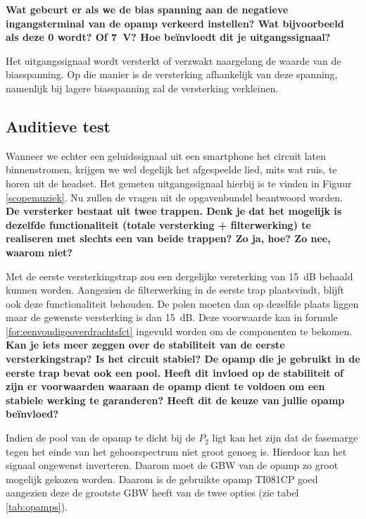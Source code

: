 \documentclass{report}
\begin{document}
\noindent \textbf{Wat gebeurt er als we de bias spanning aan de negatieve ingangsterminal van de opamp verkeerd instellen? Wat bijvoorbeeld als deze 0 wordt? Of \SI{7}{V}? Hoe beïnvloedt dit je
uitgangssignaal?}

\noindent Het uitgangssignaal wordt versterkt of verzwakt naargelang de waarde van de biasspanning. Op die manier is de versterking afhankelijk van deze spanning, namenlijk bij lagere biasspanning zal de versterking verkleinen.

\subsection{Auditieve test}

Wanneer we echter een geluidssignaal uit een smartphone het circuit laten binnenstromen, krijgen we wel degelijk het afgespeelde lied, mits wat ruis, te horen uit de headset. Het gemeten uitgangssignaal hierbij is te vinden in Figuur \ref{scopemuziek}. Nu zullen de vragen uit de opgavenbundel beantwoord worden. \\

\noindent \textbf{De versterker bestaat uit twee trappen. Denk je dat het mogelijk is dezelfde functionaliteit (totale versterking + filterwerking) te realiseren met slechts een van beide trappen? Zo ja, hoe? Zo nee, waarom niet?}

\noindent Met de eerste versterkingstrap zou een dergelijke versterking van \SI{15}{\deci\bel} behaald kunnen worden. Aangezien de filterwerking in de eerste trap plaatsvindt, blijft ook deze functionaliteit behouden. De polen moeten dan op dezelfde plaats liggen maar de gewenste versterking is dan \SI{15}{\deci\bel}. Deze voorwaarde kan in formule \ref{for:eenvoudigeoverdrachtsfct} ingevuld worden om de componenten te bekomen. \\


\noindent \textbf{Kan je iets meer zeggen over de stabiliteit van de eerste versterkingstrap? Is het circuit stabiel? De opamp die je gebruikt in de eerste trap bevat ook een pool. Heeft dit invloed op de stabiliteit of zijn er voorwaarden waaraan de opamp dient te voldoen om een stabiele werking te garanderen? Heeft dit de keuze van jullie opamp beïnvloed?}

\noindent Indien de pool van de opamp te dicht bij de $P_2$ ligt kan het zijn dat de fasemarge tegen het einde van het gehoorspectrum niet groot genoeg is. Hierdoor kan het signaal ongewenst inverteren. Daarom moet de GBW van de opamp zo groot mogelijk gekozen worden. Daarom is de gebruikte opamp TI081CP goed aangezien deze de grootste GBW heeft van de twee opties (zie tabel \ref{tab:opamps}). \\
\end{document}
